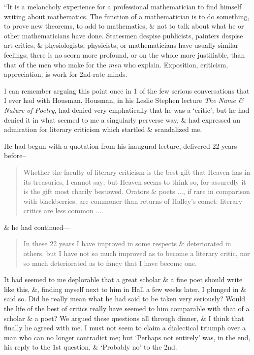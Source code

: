 \documentclass{article}
\numberwithin{equation}{section}
\begin{document}
 ``It is a melancholy experience for a professional mathematician to find himself writing about mathematics. The function of a mathematician is to do something, to prove new theorems, to add to mathematics, \& not to talk about what he or other mathematicians have done. Statesmen despise publicists, painters despise art-critics, \& physiologists, physicists, or mathematicians have usually similar feelings; there is no scorn more profound, or on the whole more justifiable, than that of the men who make for the \textit{men} who explain. Exposition, criticism, appreciation, is work for 2nd-rate minds.

I can remember arguing this point once in 1 of the few serious conversations that I ever had with Housman. Housman, in his Leslie Stephen lecture \textit{The Name \& Nature of Poetry}, had denied very emphatically that he was a `critic'; but he had denied it in what seemed to me a singularly perverse way, \& had expressed an admiration for literary criticism which startled \& scandalized me.

He had begun with a quotation from his inaugural lecture, delivered 22 years before--
\begin{quotation}
	Whether the faculty of literary criticism is the best gift that Heaven has in its treasuries, I cannot say; but Heaven seems to think so, for assuredly it is the gift most charily bestowed. Orators \& poets $\ldots$, if rare in comparison with blackberries, are commoner than returns of Halley's comet: literary critics are less common $\ldots$.
\end{quotation}
\& he had continued---
\begin{quotation}
	In these 22 years I have improved in some respects \& deteriorated in others, but I have not so much improved as to become a literary critic, nor so much deteriorated as to fancy that I have become one.
\end{quotation}
It had seemed to me deplorable that a great scholar \& a fine poet should write like this, \&, finding myself next to him in Hall a few weeks later, I plunged in \& said so. Did he really mean what he had said to be taken very seriously? Would the life of the best of critics really have seemed to him comparable with that of a scholar \& a poet? We argued these questions all through dinner, \& I think that finally he agreed with me. I must not seem to claim a dialectical triumph over a man who can no longer contradict me; but `Perhaps not entirely' was, in the end, his reply to the 1st question, \& `Probably no' to the 2nd.
\end{document}
